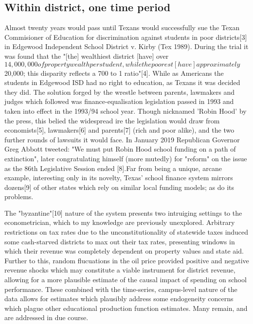 \documentclass[11pt]{article}
\begin{document}
\subsection{Within district, one time period}



Almost twenty years would pass until Texans would successfully sue the Texan Commisioner of Education for discrimination against students in poor districts[3] in Edgewood Independent School District v. Kirby (Tex 1989). During the trial it was found that the "[the] wealthiest district [have] over $ 14,000,000 of property wealth per student, while the poorest [have] approximately $ 20,000; this disparity reflects a 700 to 1 ratio"[4]. While as Americans the students in Edgewood ISD had no right to education, as Texans it was decided they did. The solution forged by the wrestle between parents, lawmakers and judges which followed was finance-equalisation legislation passed in 1993 and taken into effect in the 1993/94 school year. Though nicknamed 'Robin Hood' by the press, this belied the widespread ire the legislation would draw from economists[5], lawmakers[6] and parents[7] (rich and poor alike), and the two further rounds of lawsuits it would face. In January 2019 Republican Governor Greg Abbott tweeted: "We must put Robin Hood school funding on a path of extinction", later congratulating himself (more mutedly) for "reform" on the issue as the 86th Legislative Session ended [8].Far from being a unique, arcane example, interesting only in its novelty, Texas' school finance system mirrors dozens[9] of other states which rely on similar local funding models; as do its problems. 

The "byzantine"[10] nature of the system presents two intruiging settings to the econometrician, which to my knowledge are previously unexplored. Arbitrary restrictions on tax rates due to the unconstitutionality of statewide taxes induced some cash-starved districts to max out their tax rates, presenting windows in which their revenue was completely dependent on property values and state aid. Further to this, random flucuations in the oil price provided positive and negative revenue shocks which may constitute a viable instrument for district revenue, allowing for a more plausible estimate of the causal impact of spending on school performance. These combined with the time-series, campus-level nature of the data allows for estimates which plausibly address some endogeneity concerns which plague other educational production function estimates. Many remain, and are addressed in due course. 
\end{document}
